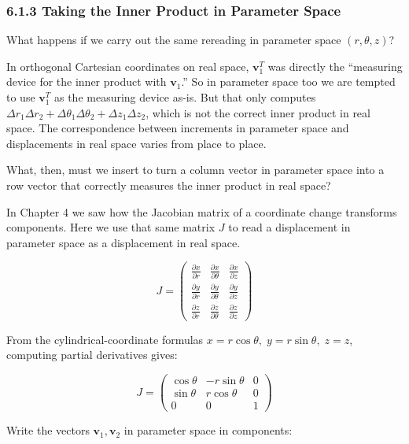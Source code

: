 \hypertarget{taking-the-inner-product-in-parameter-space}{%
\subsubsection{6.1.3 Taking the Inner Product in Parameter
Space}\label{taking-the-inner-product-in-parameter-space}}

What happens if we carry out the same rereading in parameter space
\((r,\theta,z)\)?

In orthogonal Cartesian coordinates on real space, \(\mathbf{v}_1^T\)
was directly the ``measuring device for the inner product with
\(\mathbf{v}_1\).'' So in parameter space too we are tempted to use
\(\mathbf{v}_1^T\) as the measuring device as-is. But that only computes
\(\Delta r_1 \Delta r_2 + \Delta\theta_1 \Delta\theta_2 + \Delta z_1 \Delta z_2\),
which is not the correct inner product in real space. The correspondence
between increments in parameter space and displacements in real space
varies from place to place.

What, then, must we insert to turn a column vector in parameter space
into a row vector that correctly measures the inner product in real
space?

In Chapter 4 we saw how the Jacobian matrix of a coordinate change
transforms components. Here we use that same matrix \(J\) to read a
displacement in parameter space as a displacement in real space.

\[J = \begin{pmatrix}
\frac{\partial x}{\partial r} & \frac{\partial x}{\partial \theta} & \frac{\partial x}{\partial z} \\
\frac{\partial y}{\partial r} & \frac{\partial y}{\partial \theta} & \frac{\partial y}{\partial z} \\
\frac{\partial z}{\partial r} & \frac{\partial z}{\partial \theta} & \frac{\partial z}{\partial z}
\end{pmatrix}\]

From the cylindrical-coordinate formulas
\(x = r\cos\theta,\; y = r\sin\theta,\; z = z\), computing partial
derivatives gives:

\[J = \begin{pmatrix}
\cos\theta & -r\sin\theta & 0 \\
\sin\theta & r\cos\theta & 0 \\
0 & 0 & 1
\end{pmatrix}\]

Write the vectors \(\mathbf{v}_1, \mathbf{v}_2\) in parameter space in
components:

